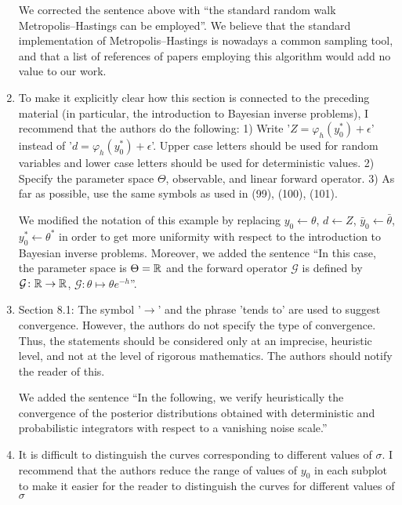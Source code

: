 \documentclass[10pt]{article}
\begin{document}
\begin{enumerate}
	We corrected the sentence above with ``the standard random walk Metropolis--Hastings can be employed''. We believe that the standard implementation of Metropolis--Hastings is nowadays a common sampling tool, and that a list of references of papers employing this algorithm would add no value to our work.  
	\item 
	\begin{itquote}
		{\normalfont [Section 8.1]} To make it explicitly clear how this section is connected to the preceding material (in particular, the introduction to Bayesian inverse problems), I recommend that the authors do the following: 1) Write '$Z=\varphi_h(y_0^\ast)+\epsilon$' instead of '$d= \varphi_h(y_0^\ast)+\epsilon$'. Upper case letters should be used for random variables and lower case letters should be used for deterministic values. 2) Specify the parameter space $\Theta$, observable, and linear forward operator. 3) As far as possible, use the same symbols as used in (99), (100), (101).
	\end{itquote}
	We modified the notation of this example by replacing $y_0 \leftarrow \theta$, $d \leftarrow Z$, $\bar y_0 \leftarrow \bar \theta$, $y_0^* \leftarrow \theta^*$ in order to get more uniformity with respect to the introduction to Bayesian inverse problems. Moreover, we added the sentence ``In this case, the parameter space is $\Theta = \mathbb{R}$ and the forward operator $\mathcal G$ is defined by $\mathcal G\colon \mathbb{R} \to \mathbb{R}$, $\mathcal G \colon \theta \mapsto \theta e^{-h}$''. 
	\item
	\begin{itquote}
		Section 8.1: The symbol '$\to$' and the phrase 'tends to' are used to suggest convergence. However, the authors do not specify the type of convergence. Thus, the statements should be considered only at an imprecise, heuristic level, and not at the level of rigorous mathematics. The authors should notify the reader of this.
	\end{itquote}
	We added the sentence ``In the following, we verify heuristically the convergence of the posterior distributions obtained with deterministic and probabilistic integrators with respect to a vanishing noise scale.''
	\item 
	\begin{itquote}
		{\normalfont [Figure 3]} It is difficult to distinguish the curves corresponding to different values of $\sigma$. I recommend that the authors reduce the range of values of $y_0$ in each subplot to make it easier for the reader to distinguish the curves for different values of $\sigma$

\end{itquote}
\end{enumerate}
\end{document}
